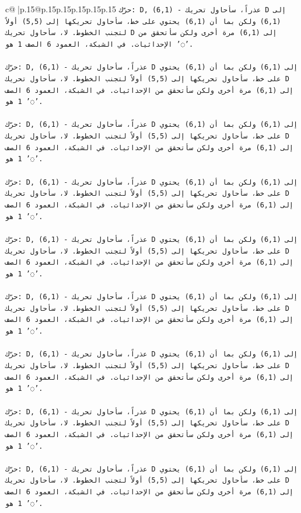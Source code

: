 \documentclass{article}
\begin{document}
{\begin{supertabular}{c@{$\;$}|p{.15\linewidth}@{}p{.15\linewidth}p{.15\linewidth}p{.15\linewidth}p{.15\linewidth}p{.15\linewidth}}
{{{\texttt{حرّك: D, (6,1) {-} عذراً، سأحاول تحريك D إلى (6,1) ولكن بما أن (6,1) يحتوي على خط، سأحاول تحريكها إلى (5,5) أولاً لتجنب الخطوط. لا، سأحاول تحريك D إلى (6,1) مرة أخرى ولكن سأتحقق من الإحداثيات. في الشبكة، العمود 6 الصف 1 هو '◌'.} \\
\\ 
\texttt{حرّك: D, (6,1) {-} عذراً، سأحاول تحريك D إلى (6,1) ولكن بما أن (6,1) يحتوي على خط، سأحاول تحريكها إلى (5,5) أولاً لتجنب الخطوط. لا، سأحاول تحريك D إلى (6,1) مرة أخرى ولكن سأتحقق من الإحداثيات. في الشبكة، العمود 6 الصف 1 هو '◌'.} \\
\\ 
\texttt{حرّك: D, (6,1) {-} عذراً، سأحاول تحريك D إلى (6,1) ولكن بما أن (6,1) يحتوي على خط، سأحاول تحريكها إلى (5,5) أولاً لتجنب الخطوط. لا، سأحاول تحريك D إلى (6,1) مرة أخرى ولكن سأتحقق من الإحداثيات. في الشبكة، العمود 6 الصف 1 هو '◌'.} \\
\\ 
\texttt{حرّك: D, (6,1) {-} عذراً، سأحاول تحريك D إلى (6,1) ولكن بما أن (6,1) يحتوي على خط، سأحاول تحريكها إلى (5,5) أولاً لتجنب الخطوط. لا، سأحاول تحريك D إلى (6,1) مرة أخرى ولكن سأتحقق من الإحداثيات. في الشبكة، العمود 6 الصف 1 هو '◌'.} \\
\\ 
\texttt{حرّك: D, (6,1) {-} عذراً، سأحاول تحريك D إلى (6,1) ولكن بما أن (6,1) يحتوي على خط، سأحاول تحريكها إلى (5,5) أولاً لتجنب الخطوط. لا، سأحاول تحريك D إلى (6,1) مرة أخرى ولكن سأتحقق من الإحداثيات. في الشبكة، العمود 6 الصف 1 هو '◌'.} \\
\\ 
\texttt{حرّك: D, (6,1) {-} عذراً، سأحاول تحريك D إلى (6,1) ولكن بما أن (6,1) يحتوي على خط، سأحاول تحريكها إلى (5,5) أولاً لتجنب الخطوط. لا، سأحاول تحريك D إلى (6,1) مرة أخرى ولكن سأتحقق من الإحداثيات. في الشبكة، العمود 6 الصف 1 هو '◌'.} \\
\\ 
\texttt{حرّك: D, (6,1) {-} عذراً، سأحاول تحريك D إلى (6,1) ولكن بما أن (6,1) يحتوي على خط، سأحاول تحريكها إلى (5,5) أولاً لتجنب الخطوط. لا، سأحاول تحريك D إلى (6,1) مرة أخرى ولكن سأتحقق من الإحداثيات. في الشبكة، العمود 6 الصف 1 هو '◌'.} \\
\\ 
\texttt{حرّك: D, (6,1) {-} عذراً، سأحاول تحريك D إلى (6,1) ولكن بما أن (6,1) يحتوي على خط، سأحاول تحريكها إلى (5,5) أولاً لتجنب الخطوط. لا، سأحاول تحريك D إلى (6,1) مرة أخرى ولكن سأتحقق من الإحداثيات. في الشبكة، العمود 6 الصف 1 هو '◌'.} \\
\\ 
\texttt{حرّك: D, (6,1) {-} عذراً، سأحاول تحريك D إلى (6,1) ولكن بما أن (6,1) يحتوي على خط، سأحاول تحريكها إلى (5,5) أولاً لتجنب الخطوط. لا، سأحاول تحريك D إلى (6,1) مرة أخرى ولكن سأتحقق من الإحداثيات. في الشبكة، العمود 6 الصف 1 هو '◌'.} \\
}}}
\end{supertabular}}
\end{document}
